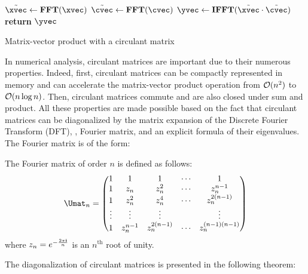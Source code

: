 \begin{algorithm}[htb]
  \begin{algorithmic}[1]
     
      \State $\tilde{\xvec} \gets \textbf{FFT}(\xvec)$
      \State $\tilde{\cvec} \gets \textbf{FFT}(\cvec)$
      \State $\yvec \gets \textbf{IFFT}(\tilde{\xvec} \cdot \tilde{\cvec})$ 
      \State \textbf{return} $\yvec$ 
    \EndProcedure
  \end{algorithmic}
  \caption{Matrix-vector product with a circulant matrix}
  \label{algorithm:ch2-matrix_vector_product_circulant_matrix}
\end{algorithm}


In numerical analysis, circulant matrices are important due to their numerous properties.
Indeed, first, circulant matrices can be compactly represented in memory and can accelerate the matrix-vector product operation from $\mathcal{O}(n^2)$ to $\mathcal{O}(n \log n)$.
Then, circulant matrices commute and are also closed under sum and product.
All these properties are made possible based on the fact that circulant matrices can be diagonalized by the matrix expansion of the Discrete Fourier Transform (DFT), \ie, Fourier matrix, and an explicit formula of their eigenvalues.
The Fourier matrix is of the form:
\begin{definition}
  The Fourier matrix of order $n$ is defined as follows:
  \begin{equation} \label{definition:ch2-fourier_matrix}
    \Umat_n = 
    \leftmatrix
      1      & 1         & 1            & \cdots & 1                \\
      1      & z_n       & z_n^2        & \cdots & z_n^{n-1}        \\
      1      & z_n^2     & z_n^4        & \cdots & z_n^{2(n-1)}     \\
      \vdots & \vdots    & \vdots       &        & \vdots           \\
      1      & z_n^{n-1} & z_n^{2(n-1)} & \cdots & z_n^{(n-1)(n-1)}
    \rightmatrix
  \end{equation}
  where $z_n = e^{-\frac{2\pi\mathbf{i}}{n}}$ is an $n^{\text{th}}$ root of unity.
\end{definition}
\noindent
The diagonalization of circulant matrices is presented in the following theorem:
